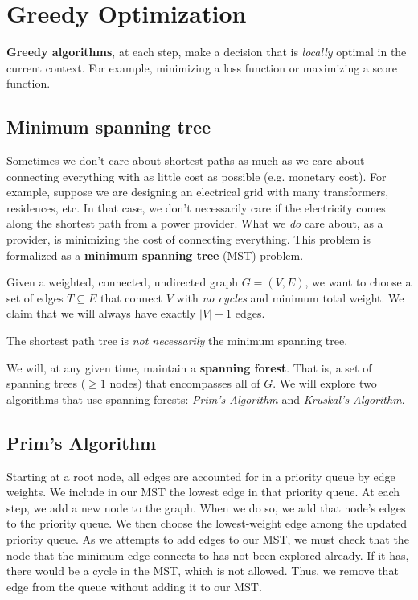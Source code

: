\documentclass[titlepage, 12pt, leqno]{article}
\begin{document}
\section{Greedy Optimization}

\begin{definition}
    \textbf{Greedy algorithms}, at each step, make a decision that is
    \textit{locally} optimal in the current context. For example, minimizing
    a loss function or maximizing a score function.
\end{definition}

\subsection{Minimum spanning tree}
Sometimes we don't care about shortest paths as much as we care about connecting
everything with as little cost as possible (e.g. monetary cost). For example,
suppose we are designing an electrical grid with many transformers, residences,
etc. In that case, we don't necessarily care if the electricity comes along the
shortest path from a power provider. What we \textit{do} care about, as a 
provider, is minimizing the cost of connecting everything. This problem is
formalized as a \textbf{minimum spanning tree} (MST) problem.

Given a weighted, connected, undirected graph $G = (V,E)$, we want to choose
a set of edges $T \subseteq E$ that connect $V$ with \textit{no cycles} and
minimum total weight. We claim that we will always have exactly $|V|-1$ edges.

\begin{note}
    The shortest path tree is \textit{not necessarily} the minimum spanning
    tree.
\end{note}

We will, at any given time, maintain a \textbf{spanning forest}. That is, a set
of spanning trees ($\ge1$ nodes) that encompasses all of $G$. We will explore
two algorithms that use spanning forests: \textit{Prim's Algorithm} and 
\textit{Kruskal's Algorithm}.

\subsection{Prim's Algorithm}
Starting at a root node, all edges are accounted for in a priority queue by
edge weights. We include in our MST the lowest edge in that priority queue.
At each step, we add a new node to the graph. When we do so, we add that 
node's edges to the priority queue. We then choose the lowest-weight edge among
the updated priority queue. As we attempts to add edges to our MST, we must
check that the node that the minimum edge connects to has not been explored 
already. If it has, there would be a cycle in the MST, which is not allowed.
Thus, we remove that edge from the queue without adding it to our MST.
\end{document}
